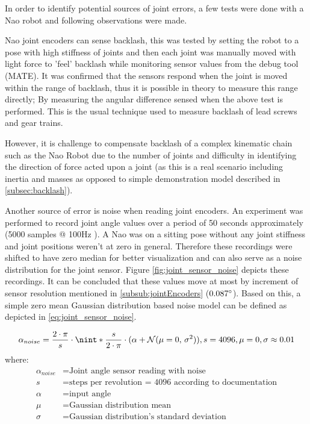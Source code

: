 \documentclass[english, printversion, nomenclature, notitle]{tuvisionthesis} %
\makeatletter
\renewcommand{\todo}[2][]{\tikzexternaldisable\@todo[#1]{#2}\tikzexternalenable}
\DeclarePairedDelimiter{\nint}\lfloor\rceil
\makeatother
\begin{document}
In order to identify potential sources of joint errors, a few tests were done with a Nao robot and following observations were made.

Nao joint encoders can sense backlash, this was tested by setting the robot to a pose with high stiffness of joints and then each joint was manually moved with light force to 'feel' backlash while monitoring sensor values from the debug tool (MATE). It was confirmed that the sensors respond when the joint is moved within the range of backlash, thus it is possible in theory to measure this range directly; By measuring the angular difference sensed when the above test is performed. This is the usual technique used to measure backlash of lead screws and gear trains.

However, it is challenge to compensate backlash of a complex kinematic chain such as the Nao Robot due to the number of joints and difficulty in identifying the direction of force acted upon a joint (as this is a real scenario including inertia and masses as opposed to simple demonstration model described in \cref{subsec:backlash}).

Another source of error is noise when reading joint encoders. An experiment was performed to record joint angle values over a period of 50 seconds approximately (5000 samples @ 100Hz \todo{add actual rate}). A Nao was on a sitting pose without any joint stiffness and joint positions weren't at zero in general. Therefore these recordings were shifted to have zero median for better visualization and can also serve as a noise distribution for the joint sensor. Figure \ref{fig:joint_sensor_noise} depicts these recordings. It can be concluded that these values move at most by increment of sensor resolution mentioned in \cref{subsub:jointEncoders} ($0.087\degree$). Based on this, a simple zero mean Gaussian distribution based noise model can be defined as depicted in \cref{eq:joint_sensor_noise}.

\begin{equation}
\alpha_{noise} = \frac{2 \cdot \pi}{s} \cdot \nint*{\frac{s}{2 \cdot \pi } \cdot ( \alpha + \mathcal{N}(\mu = 0,\,\sigma^{2}))}, s = 4096, \mu = 0, \sigma \approx 0.01
\label{eq:joint_sensor_noise}
\end{equation}
where:
\begin{align*}
\alpha_{noise} &= \text{Joint angle sensor reading with noise}\\
s &= \text{steps per revolution = 4096 according to documentation}\\
\alpha &= \text{input angle}\\
\mu &= \text{Gaussian distribution mean}\\
\sigma &= \text{Gaussian distribution's standard deviation}
\end{align*}
\end{document}
